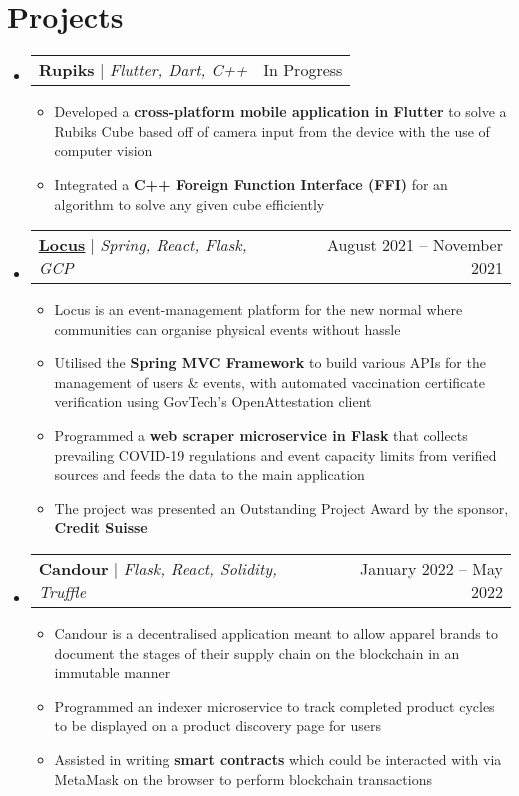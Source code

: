 \documentclass[letterpaper,11pt]{article}
\makeatletter
\newcommand{\resumeItem}[1]{
  \item\small{
    {#1 \vspace{-2pt}}
  }
}
\newcommand{\resumeProjectHeading}[2]{
    \item
    \begin{tabular*}{0.97\textwidth}{l@{\extracolsep{\fill}}r}
      \small#1 & #2 \\
    \end{tabular*}\vspace{-7pt}
}
\newcommand{\resumeSubHeadingListStart}{\begin{itemize}[leftmargin=0.15in, label={}]}
\newcommand{\resumeSubHeadingListEnd}{\end{itemize}}
\newcommand{\resumeItemListStart}{\begin{itemize}}
\newcommand{\resumeItemListEnd}{\end{itemize}\vspace{-5pt}}
\makeatother
\begin{document}
\section{Projects}
    \resumeSubHeadingListStart
      \resumeProjectHeading
          {\textbf{Rupiks} $|$ \emph{Flutter, Dart, C++}}{In Progress}
          \resumeItemListStart
            \resumeItem{Developed a \textbf{cross-platform mobile application in Flutter} to solve a Rubiks Cube based off of camera input from the device with the use of computer vision}
            \resumeItem{Integrated a \textbf{C++ Foreign Function Interface (FFI)} for an algorithm to solve any given cube efficiently}
          \resumeItemListEnd
      \resumeProjectHeading
          {\textbf{\href{https://github.com/omerwyo/Locus}{\underline{Locus}}} $|$ \emph{Spring, React, Flask, GCP}}{August 2021 -- November 2021}
          \resumeItemListStart
            \resumeItem{Locus is an event-management platform for the new normal where communities can organise physical events without hassle}
            \resumeItem{Utilised the \textbf{Spring MVC Framework} to build various APIs for the management of users \& events, with automated vaccination certificate verification using GovTech's OpenAttestation client}
            \resumeItem{Programmed a \textbf{web scraper microservice in Flask} that collects prevailing COVID-19 regulations and event capacity limits from verified sources and feeds the data to the main application}
            \resumeItem{The project was presented an Outstanding Project Award by the sponsor, \textbf{Credit Suisse}}
          \resumeItemListEnd
      \resumeProjectHeading
          {\textbf{Candour} $|$ \emph{Flask, React, Solidity, Truffle}}{January 2022 -- May 2022}
          \resumeItemListStart
            \resumeItem{Candour is a decentralised application meant to allow apparel brands to document the stages of their supply chain on the blockchain in an immutable manner}
            \resumeItem{Programmed an indexer microservice to track completed product cycles to be displayed on a product discovery page for users}
            \resumeItem{Assisted in writing \textbf{smart contracts} which could be interacted with via MetaMask on the browser to perform blockchain transactions}
          \resumeItemListEnd
    \resumeSubHeadingListEnd
\end{document}
